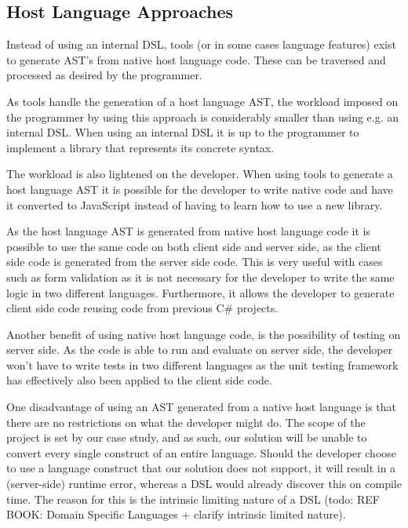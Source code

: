 	\subsection{Host Language Approaches} %
	\label{sub:host_language_approaches}
		Instead of using an internal DSL, tools (or in some cases language features) exist to generate AST’s from native host language code. These can be traversed and processed as desired by the programmer.

		As tools handle the generation of a host language AST, the workload imposed on the programmer by using this approach is considerably smaller than using e.g. an internal DSL. When using an internal DSL it is up to the programmer to implement a library that represents its concrete syntax.

		The workload is also lightened on the developer. When using tools to generate a host language AST it is possible for the developer to write native code and have it converted to JavaScript instead of having to learn how to use a new library.

		As the host language AST is generated from native host language code it is possible to use the same code on both client side and server side, as the client side code is generated from the server side code. This is very useful with cases such as form validation as it is not necessary for the developer to write the same logic in two different languages. Furthermore, it allows the developer to generate client side code reusing code from previous C\# projects.

		Another benefit of using native host language code, is the possibility of testing on server side. As the code is able to run and evaluate on server side, the developer won't have to write tests in two different languages as the unit testing framework has effectively also been applied to the client side code.

		One disadvantage of using an AST generated from a native host language is that there are no restrictions on what the developer might do. The scope of the project is set by our case study, and as such, our solution will be unable to convert every single construct of an entire language. Should the developer choose to use a language construct that our solution does not support, it will result in a (server-side) runtime error, whereas a DSL would already discover this on compile time. The reason for this is the intrinsic limiting nature of a DSL (todo: REF BOOK: Domain Specific Languages + clarify intrinsic limited nature).

